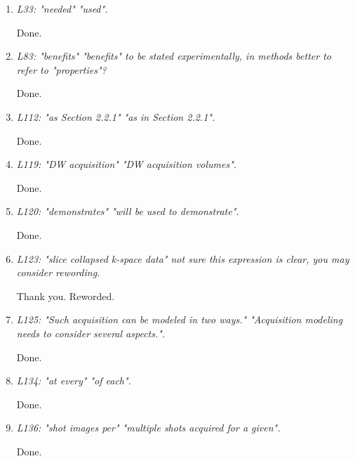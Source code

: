 \documentclass[a4paper,11pt,twoside]{report}
\begin{document}
\begin{enumerate}[resume]
    \item \textit{L33: "needed" \textrightarrow "used".}

    \hspace{1em} Done.

    \item \textit{L83: "benefits" \textrightarrow "benefits" to be stated experimentally, in methods better to refer to "properties"?}

    \hspace{1em} Done.

    \item \textit{L112: "as Section 2.2.1" \textrightarrow "as in Section 2.2.1".}

    \hspace{1em} Done.

    \item \textit{L119: "DW acquisition" \textrightarrow "DW acquisition volumes".}

    \hspace{1em} Done.

    \item \textit{L120: "demonstrates" \textrightarrow "will be used to demonstrate".}

    \hspace{1em} Done.

    \item \textit{L123: "slice collapsed k-space data" \textrightarrow not sure this expression is clear, you may consider rewording.}

    \hspace{1em} Thank you. Reworded.

    \item \textit{L125: "Such acquisition can be modeled in two ways." \textrightarrow "Acquisition modeling needs to consider several aspects.".}

    \hspace{1em} Done.

    \item \textit{L134: "at every" \textrightarrow "of each".}

    \hspace{1em} Done.

    \item \textit{L136: "shot images per" \textrightarrow "multiple shots acquired for a given".}

    \hspace{1em} Done.


\end{enumerate}
\end{document}
